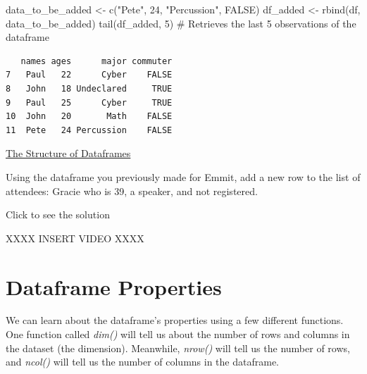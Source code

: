 \documentclass[
  letterpaper,
  DIV=11,
  numbers=noendperiod]{scrreprt}
\newenvironment{Shaded}{\begin{snugshade}}{\end{snugshade}}
\newcommand{\CommentTok}[1]{\textcolor[rgb]{0.37,0.37,0.37}{#1}}
\newcommand{\ConstantTok}[1]{\textcolor[rgb]{0.56,0.35,0.01}{#1}}
\newcommand{\DecValTok}[1]{\textcolor[rgb]{0.68,0.00,0.00}{#1}}
\newcommand{\FunctionTok}[1]{\textcolor[rgb]{0.28,0.35,0.67}{#1}}
\newcommand{\NormalTok}[1]{\textcolor[rgb]{0.00,0.23,0.31}{#1}}
\newcommand{\OtherTok}[1]{\textcolor[rgb]{0.00,0.23,0.31}{#1}}
\newcommand{\StringTok}[1]{\textcolor[rgb]{0.13,0.47,0.30}{#1}}
\begin{document}
\begin{Shaded}
\begin{Highlighting}[]
\NormalTok{data\_to\_be\_added }\OtherTok{\textless{}{-}} \FunctionTok{c}\NormalTok{(}\StringTok{"Pete"}\NormalTok{, }\DecValTok{24}\NormalTok{, }\StringTok{"Percussion"}\NormalTok{, }\ConstantTok{FALSE}\NormalTok{)}
\NormalTok{df\_added }\OtherTok{\textless{}{-}} \FunctionTok{rbind}\NormalTok{(df, data\_to\_be\_added)}
\FunctionTok{tail}\NormalTok{(df\_added, }\DecValTok{5}\NormalTok{) }\CommentTok{\# Retrieves the last 5 observations of the dataframe}
\end{Highlighting}
\end{Shaded}

\begin{verbatim}
   names ages      major commuter
7   Paul   22      Cyber    FALSE
8   John   18 Undeclared     TRUE
9   Paul   25      Cyber     TRUE
10  John   20       Math    FALSE
11  Pete   24 Percussion    FALSE
\end{verbatim}

\begin{watch}{}{}
    \href{https://youtu.be/0BlLEFou1kM}{The Structure of Dataframes}
\end{watch}

\begin{tcolorbox}[enhanced jigsaw, colbacktitle=quarto-callout-tip-color!10!white, breakable, bottomrule=.15mm, colframe=quarto-callout-tip-color-frame, left=2mm, opacitybacktitle=0.6, title=\textcolor{quarto-callout-tip-color}{\faLightbulb}\hspace{0.5em}{Try it Out}, leftrule=.75mm, opacityback=0, rightrule=.15mm, titlerule=0mm, bottomtitle=1mm, colback=white, toprule=.15mm, arc=.35mm, toptitle=1mm, coltitle=black]

Using the dataframe you previously made for Emmit, add a new row to the
list of attendees: Gracie who is 39, a speaker, and not registered.

Click to see the solution

XXXX INSERT VIDEO XXXX

\end{tcolorbox}

\section{Dataframe Properties}\label{dataframe-properties}

We can learn about the dataframe's properties using a few different
functions. One function called \emph{dim()} will tell us about the
number of rows and columns in the dataset (the dimension). Meanwhile,
\emph{nrow()} will tell us the number of rows, and \emph{ncol()} will
tell us the number of columns in the dataframe.
\end{document}
